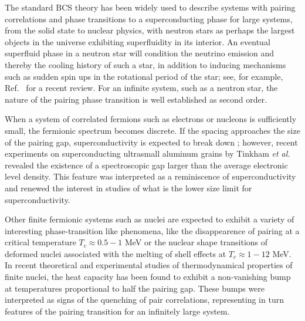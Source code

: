 \begin{multicols}{2}  
The standard BCS theory has been widely used to describe 
systems with pairing correlations and phase transitions to a
superconducting phase for large systems, 
from the solid state to nuclear physics,
with neutron stars as perhaps the largest objects in the universe
exhibiting  superfluidity in its interior.  
An eventual superfluid phase in a neutron star will condition 
the neutrino emission and thereby the cooling history of such a
star, in addition to inducing mechanisms such as 
sudden spin ups in the rotational
period of the star; see, for example, Ref.~\cite{hh2000} for a recent review. 
For an infinite system, such as a neutron star, the nature
of the pairing phase transition is well established as second order.
 
When a system of correlated fermions such as electrons or
nucleons is sufficiently small,
the fermionic spectrum becomes
discrete. If the spacing approaches the size of the pairing gap,
superconductivity is expected to break down \cite{anderson59};
however, recent experiments on superconducting ultrasmall aluminum 
grains by Tinkham
{\em et al.} \cite{tinkham9598} revealed the existence of a
spectroscopic gap larger than the average electronic level density.
This feature was interpreted as a reminiscence of superconductivity
and renewed the interest \cite{delft98,mastellone98,sierra99,delft2000}
in studies  of what is the lower size limit for superconductivity.

Other finite fermionic systems such as   
nuclei are expected to
exhibit a variety of interesting phase-transition like phenomena, like
the disappearence of pairing at a critical temperature $T_c\approx
0.5-1$ MeV or the nuclear shape transitions of deformed nuclei
associated with the melting of shell effects at  
$T_c\approx 1-12$ MeV.  
In recent theoretical and experimental studies \cite{yoram2000,andreas2000}
of thermodynamical properties of finite nuclei, the heat capacity 
has been found to exhibit a non-vanishing bump at temperatures proportional to
half the pairing gap. These bumps were interpreted as  signs of the 
quenching of pair correlations, representing in turn features
of the pairing transition for an infinitely large system. 


\end{multicols}
